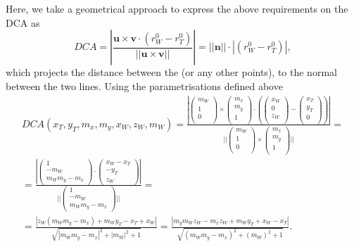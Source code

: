 \documentclass[a4paper,11pt]{article}
\begin{document}
Here, we take a geometrical approach to express the above requirements on the DCA as
\begin{equation}
DCA = |\frac{\textbf{u} \times \textbf{v} \cdot (r^0_W - r^0_T) }{||\textbf{u} \times \textbf{v}||}| = ||\textbf{n}|| \cdot |(r^0_W - r^0_T)| ,
\end{equation}
which projects the distance between the  (or any other points), to the normal between the two lines. Using the parametrisations defined above
\begin{equation}
\begin{split}
DCA(x_T, y_T, m_x, m_y, x_W, z_W, m_W) = \frac{|\begin{pmatrix} m_W \\ 1\\  0\\\end{pmatrix} \times \begin{pmatrix} m_x\\ m_y \\  1\\\end{pmatrix} \cdot (\begin{pmatrix}x_W  \\0 \\  z_W\\\end{pmatrix} - \begin{pmatrix}x_T \\y_T  \\  0\\\end{pmatrix}) |}{||\begin{pmatrix} m_W \\ 1\\  0\\\end{pmatrix} \times \begin{pmatrix}m_x\\ m_y \\  1\\\end{pmatrix}||} = 
\\ = \frac{|\begin{pmatrix} 1 \\ -m_W \\ m_Wm_y - m_x  \end{pmatrix} \cdot
\begin{pmatrix} x_W-x_T \\ -y_T \\ z_W  \end{pmatrix} |}{||\begin{pmatrix} 1 \\ -m_W \\ m_Wm_y - m_x  \end{pmatrix}||}  = \\
= \frac{|z_W (m_W m_y-m_x)+m_W y_T-x_T+x_W|}{\sqrt{\left| m_W m_y-m_x\right|^2+\left| m_W\right|^2+1}}
= \frac{| m_ym_Wz_W-m_xz_W + m_Wy_T + x_W - x_T |}{\sqrt{(m_W m_y-m_x)^2+(m_W)^2+1}}.
\label{eq:DCAGeom}
\end{split}
\end{equation}
\end{document}

